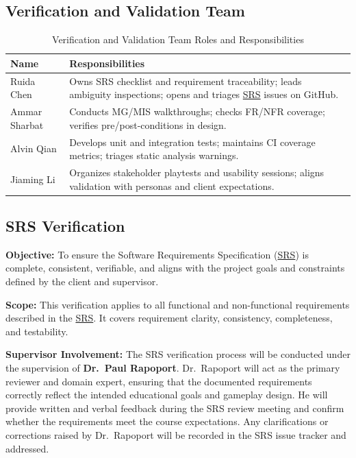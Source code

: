 \documentclass[12pt, titlepage]{article}
\begin{document}
\subsection{Verification and Validation Team}

\begin{table}[H]
\centering
\caption{Verification and Validation Team Roles and Responsibilities}
\label{tab:vvteam}
\begin{tabularx}{\textwidth}{lX}
\toprule
\textbf{Name} & \textbf{Responsibilities} \\
\midrule
Ruida Chen & Owns SRS checklist and requirement traceability; leads ambiguity inspections; opens and triages \href{../SRS/SRS.pdf}{SRS} issues on GitHub. \\
Ammar Sharbat & Conducts MG/MIS walkthroughs; checks FR/NFR coverage; verifies pre/post-conditions in design. \\
Alvin Qian & Develops unit and integration tests; maintains CI coverage metrics; triages static analysis warnings. \\
Jiaming Li & Organizes stakeholder playtests and usability sessions; aligns validation with personas and client expectations. \\
\bottomrule
\end{tabularx}
\end{table}

\subsection{SRS Verification}
\textbf{Objective:}  
To ensure the Software Requirements Specification (\href{../SRS/SRS.pdf}{SRS}) is complete, consistent, verifiable, and aligns with the project goals and constraints defined by the client and supervisor.

\noindent \textbf{Scope:}  
This verification applies to all functional and non-functional requirements described in the \href{../SRS/SRS.pdf}{SRS}. It covers requirement clarity, consistency, completeness, and testability.  

\noindent \textbf{Supervisor Involvement:}  
The SRS verification process will be conducted under the supervision of \textbf{Dr.\ Paul Rapoport}.  
Dr.\ Rapoport will act as the primary reviewer and domain expert, ensuring that the documented requirements correctly reflect the intended educational goals and gameplay design.  
He will provide written and verbal feedback during the SRS review meeting and confirm whether the requirements meet the course expectations.  
Any clarifications or corrections raised by Dr.\ Rapoport will be recorded in the SRS issue tracker and addressed.
\end{document}
